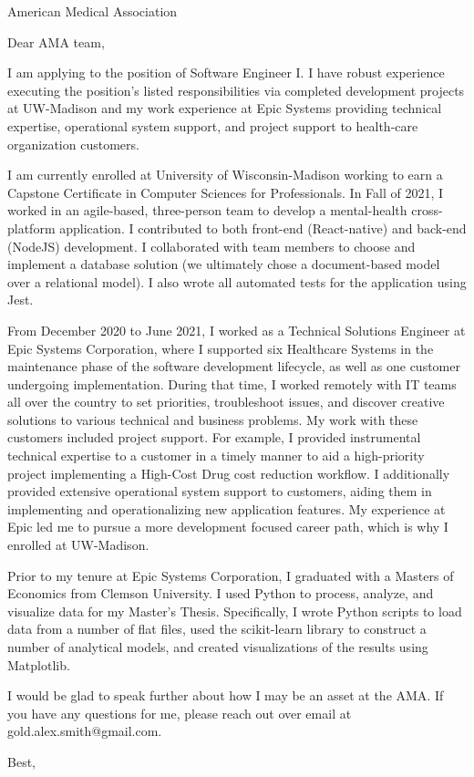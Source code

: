 \documentclass[a4paper, 10pt]{letter}
\begin{document}
	\begin{letter}
	{
	   American Medical Association 
	}

		    \opening{Dear AMA team,}


    I am applying to the position of Software Engineer I. I have robust experience executing the position's listed responsibilities via completed development projects at UW-Madison and my work experience at Epic Systems providing technical expertise, operational system support, and project support to health-care organization customers. 

    I am currently enrolled at University of Wisconsin-Madison working to earn a Capstone Certificate in Computer Sciences for Professionals. In Fall of 2021, I worked in an agile-based, three-person team to develop a mental-health cross-platform application. I contributed to both front-end (React-native) and back-end (NodeJS) development. I collaborated with team members to choose and implement a database solution (we ultimately chose a document-based model over a relational model). I also wrote all automated tests for the application using Jest. 

    From December 2020 to June 2021, I worked as a Technical Solutions Engineer at Epic Systems Corporation, where I supported six Healthcare Systems in the maintenance phase of the software development lifecycle, as well as one customer undergoing implementation. During that time, I worked remotely with IT teams all over the country to set priorities, troubleshoot issues, and discover creative solutions to various technical and business problems. My work with these customers included project support. For example, I provided instrumental technical expertise to a customer in a timely manner to aid a high-priority project implementing a High-Cost Drug cost reduction workflow. I additionally provided extensive operational system support to customers, aiding them in implementing and operationalizing new application features. My experience at Epic led me to pursue a more development focused career path, which is why I enrolled at UW-Madison.

		Prior to my tenure at Epic Systems Corporation, I graduated with a Masters of Economics from Clemson University. I used Python to process, analyze, and visualize data for my Master’s Thesis. Specifically, I wrote Python scripts to load data from a number of flat files, used the scikit-learn library to construct a number of analytical models, and created visualizations of the results using Matplotlib.

		I would be glad to speak further about how I may be an asset at the AMA. If you have any questions for me, please reach out over email at gold.alex.smith@gmail.com. 


		    \closing{Best,}

		    \end{letter}
		    
\end{document}
